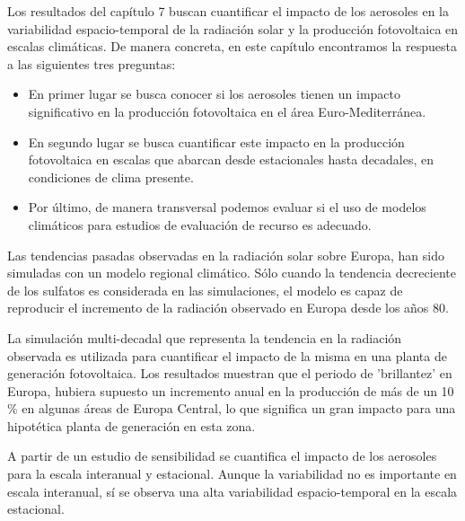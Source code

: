 Los resultados del capítulo 7 buscan cuantificar el impacto de los aerosoles en la variabilidad espacio-temporal de la radiación solar y la producción fotovoltaica en escalas climáticas. De manera concreta, en este capítulo encontramos la respuesta a las siguientes tres preguntas:

\begin{itemize}
\item En primer lugar se busca conocer si los aerosoles tienen un impacto significativo en la producción fotovoltaica en el área Euro-Mediterránea.
\item En segundo lugar se busca cuantificar este impacto en la producción fotovoltaica en escalas que abarcan desde estacionales hasta decadales, en condiciones de clima presente.
\item Por último, de manera transversal podemos evaluar si el uso de modelos climáticos para estudios de evaluación de recurso es adecuado.
\end{itemize}

Las tendencias pasadas observadas en la radiación solar sobre Europa, han sido simuladas con un modelo regional climático. Sólo cuando la tendencia decreciente de los sulfatos es considerada en las simulaciones, el modelo es capaz de reproducir el incremento de la radiación observado en Europa desde los años 80.

La simulación multi-decadal que representa la tendencia en la radiación observada es utilizada para cuantificar el impacto de la misma en una planta de generación fotovoltaica. Los resultados muestran que el periodo de 'brillantez' en Europa, hubiera supuesto un incremento anual en la producción de más de un 10$\%$ en algunas áreas de Europa Central, lo que significa un gran impacto para una hipotética planta de generación en esta zona.

A partir de un estudio de sensibilidad se cuantifica el impacto de los aerosoles para la escala interanual y estacional. Aunque la variabilidad no es importante en escala interanual, sí se observa una alta variabilidad espacio-temporal en la escala estacional. 


